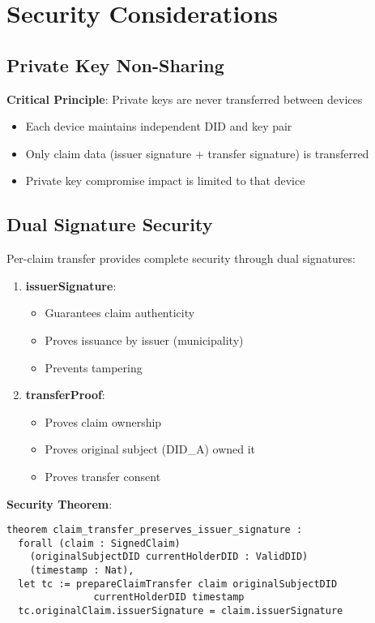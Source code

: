 \section{Security Considerations}

\subsection{Private Key Non-Sharing}

\textbf{Critical Principle}: Private keys are never transferred between devices

\begin{itemize}
  \item Each device maintains independent DID and key pair
  \item Only claim data (issuer signature + transfer signature) is transferred
  \item Private key compromise impact is limited to that device
\end{itemize}

\subsection{Dual Signature Security}

Per-claim transfer provides complete security through dual signatures:

\begin{enumerate}
  \item \textbf{issuerSignature}:
    \begin{itemize}
      \item Guarantees claim authenticity
      \item Proves issuance by issuer (municipality)
      \item Prevents tampering
    \end{itemize}

  \item \textbf{transferProof}:
    \begin{itemize}
      \item Proves claim ownership
      \item Proves original subject (DID\_A) owned it
      \item Proves transfer consent
    \end{itemize}
\end{enumerate}

\textbf{Security Theorem}:
\begin{verbatim}
theorem claim_transfer_preserves_issuer_signature :
  forall (claim : SignedClaim)
    (originalSubjectDID currentHolderDID : ValidDID)
    (timestamp : Nat),
  let tc := prepareClaimTransfer claim originalSubjectDID
               currentHolderDID timestamp
  tc.originalClaim.issuerSignature = claim.issuerSignature
\end{verbatim}

